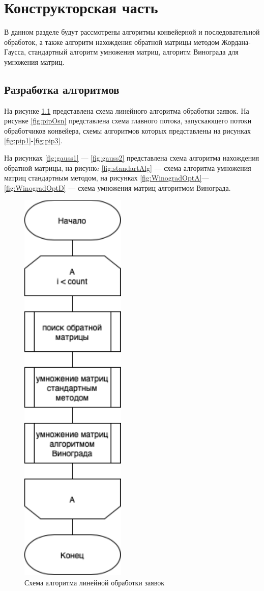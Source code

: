 \chapter{Конструкторская часть}

В данном разделе будут рассмотрены алгоритмы 
конвейерной и последовательной обработок, а также 
алгоритм нахождения обратной матрицы методом Жордана-Гаусса, стандартный 
алгоритм умножения матриц, алгоритм Винограда для умножения матриц.


\section{Разработка алгоритмов}

На рисунке \ref{fig:posled} представлена схема линейного алгоритма обработки заявок.
На рисунке \ref{fig:pipOsn} представлена схема главного потока,
запускающего потоки обработчиков конвейера, схемы алгоритмов которых представлены на
рисунках \ref{fig:pip1}-\ref{fig:pip3}.

На рисунках \ref{fig:gauss1} --- \ref{fig:gauss2} представлена схема алгоритма нахождения обратной матрицы,
на рисункe \ref{fig:standartAlg} --- схема алгоритма умножения матриц стандартным методом, на рисунках 
\ref{fig:WinogradOptA}---\ref{fig:WinogradOptD} --- схема умножения матриц алгоритмом Винограда.

\begin{figure}[h]
    \centering
    \includegraphics[width=0.3\linewidth]{img/posled.pdf}
    \caption{Схема алгоритма линейной обработки заявок}
    \label{fig:posled}
\end{figure}

